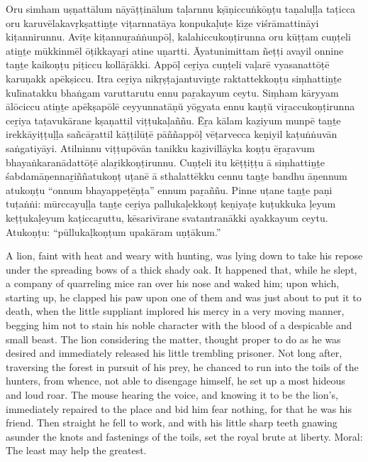 {\mmtr Oru simham u\d s\d natt\=alum n\=ay\=a\d t\d tin\=alum ta\d larnnu k\d s{\=\i}\d niccu\.nk\=o\d n\d tu
ta\d nalu\d l\d la ta\d ticca oru karuv\=elakav\d rk\d satti\b n\b te vi\d tarnnat\=aya konpuka\d lu\d te
k{\=\i}\b ze vi\'sr\=amattin\=ayi ki\d tannirunnu. Avi\d te ki\d tannu\b ra\.n\.nunp\=o\d l,
kalahiccuko\d n\d tirunna oru k\=u\d t\d tam cu\d n\d teli ati\b n\b te m\=ukkinm\=el
\=o\d tikkaya\b ri atine u\d nartti. \=Ayatunimittam \~ne\d t\d ti avayil onnine ta\b n\b te
kaiko\d n\d tu pi\d ticcu koll\=a\b r\=akki. App\=o\d l ce\b riya cu\d n\d teli va\d lar\=e
vyasanatt\=o\d t\=e karu\d nakk ap\=ek\d siccu. Itra ce\b riya nik\d r\d s\d tajantuvi\b n\b te
raktattekko\d n\d tu si\d mhatti\b n\b te kul{\=\i}natakku bha\.ngam varuttarutu ennu pa\b rakayum
ceytu. Si\d mham k\=aryyam \=al\=ociccu ati\b n\b te ap\=ek\d sap\=ol\=e ceyyunnat\=a\d n\u u
y\=ogyata ennu ka\d n\d t\u u vi\b raccuko\d n\d tirunna ce\b riya ta\d tavuk\=arane k\d sa\d nattil
vi\d t\d tuka\d la\~n\~nu. \=E\b ra k\=alam ka\b ziyum munp\=e ta\b n\b te irekk\=ayi\d t\d tu\d l\d la
sa\~nc\=a\b rattil k\=a\d t\d til\=u\d t\=e p\=a\~n\~napp\=o\d l v\=e\d tarvecca ke\d niyil
ka\d tu\.n\.nuv\=an sa\.ngatiy\=ayi. Atilninnu vi\d t\d tup\=ov\=an tanikku ka\b zivill\=ayka
ko\d n\d tu \=e\b ra\b ravum bhaya\.nkaran\=adatt\=o\d t\=e ala\b rikko\d n\d tirunnu.
Cu\d n\d teli itu k\=e\d t\d ti\d t\d tu \=a si\d mhatti\b n\b te \'sabdam\=a\d nenna\b ri\~n\~natuko\d n\d t
u\d tan\=e \=a sthalatt\=ekku cennu ta\b n\b te bandhu \=a\d nennum atuko\d n\d tu
``onnum bhayappe\d t\=e\d n\d ta'' ennum pa\b ra\~n\~nu. Pinne u\d tane
ta\b n\b te pa\d ni tu\d ta\.n\.ni: m\=urccayu\d l\d la ta\b n\b te ce\b riya palluka\d lekko\d n\d t
ke\d niya\d te ku\d tukkuka \d leyum ke\d t\d tuka\d leyum ka\d ticca\b ruttu, k\=esariv{\=\i}rane
svatantran\=akki ayakkayum ceytu.
\smallskip
Atuko\d n\d tu: ``p\=ulluka\d l{}ko\d n\d tum upak\=aram u\d n\d t\=akum.''
}

\bigskip

A lion, faint with heat and weary with hunting, was lying down to take his
repose under the spreading bows of a thick shady oak. It happened that, while
he slept, a company of quarreling mice ran over his nose and waked him; upon which,
starting up, he clapped his paw upon one of them and was just about to put
it to death, when the little suppliant implored his mercy in a very moving
manner, begging him not to stain his noble character with the blood of a despicable and
small beast. The lion considering the matter, thought proper to do as he was
desired and immediately released his little trembling prisoner. Not long after, traversing
the forest in pursuit of his prey, he chanced to run into the toils of the hunters,
from whence, not able to disengage himself, he set up a most hideous and loud
roar. The mouse hearing the voice, and knowing it to be the lion's, immediately
repaired to the place and bid him fear nothing, for that he was his friend.
Then straight he fell to work, and with his little sharp teeth gnawing asunder the knots
and fastenings of the toils, set the royal brute at liberty.
\smallskip
Moral: The least may help the greatest.

